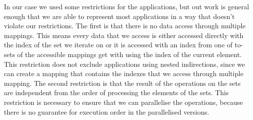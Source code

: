 In our case we used some restrictions for the applications, but out work is
general enough that we are able to represent most applications in a way that
doesn't violate our restrictions. The first is that there is no data access
through multiple mappings. This means every data that we access is either
accessed directly with the index of the set we iterate on or it is accessed
with an index from one of to-sets of the accessible mappings get with using the
index of the current element. This restriction does not exclude applications
using nested indirections, since we can create a mapping that contains the
indexes that we access through multiple mapping. The second restriction is that
the result of the operations on the sets are independent from the order of
processing the elements of the sets. This restriction is necessary to ensure
that we can parallelise the operations, because there is no guarantee for
execution order in the parallelised versions.

